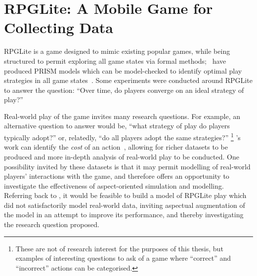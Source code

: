 \chapter{RPGLite: A Mobile Game for Collecting Data}\label{chap:rpglite}

 RPGLite is a game designed to mimic existing popular games,
while being structured to permit exploring all game states via formal
methods;
\citeauthor{kavanagh2020}~have produced PRISM models which can be model-checked
to identify optimal play strategies in all game
states~\cite{kavanagh2020}. Some
experiments were conducted around RPGLite to answer the question: ``Over time,
do players converge on an ideal strategy of play?''

Real-world play of the game invites many research questions. For example, an
alternative question to answer would be, ``what strategy of play do players
typically adopt?'' or, relatedly, ``do all players adopt the same strategies?''
\footnote{These are not of research interest for the purposes of this thesis,
but examples of interesting questions to ask of a game where ``correct'' and
``incorrect'' actions can be categorised.} \citeauthor{kavanagh2020}'s work can
identify the \emph{cost} of an action~\cite{kavanagh2020,kavanagh2021thesis},
allowing for richer datasets to be produced and more in-depth analysis of
real-world play to be conducted. One possibility invited by these datasets is
that it may permit modelling of real-world players' interactions with the game,
and therefore offers an opportunity to investigate the effectiveness of
aspect-oriented simulation and modelling. Referring back to , it would be feasible to build a model of RPGLite play
which did not satisfactorily model real-world data, inviting aspectual
augmentation of the model in an attempt to improve its performance, and thereby
investigating the research question proposed.

